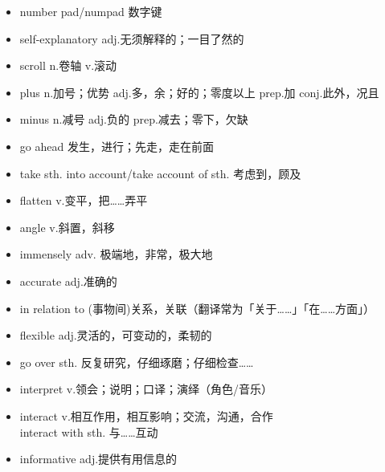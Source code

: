\documentclass[11pt,a4paper,UTF8,titlepage]{ctexrep} %
\begin{document}
\begin{multicols}{2}
\begin{itemize}
            \item number pad/numpad 数字键
            \item self-explanatory adj.无须解释的；一目了然的
            \item scroll n.卷轴 v.滚动
            \item plus n.加号；优势 adj.多，余；好的；零度以上 prep.加 conj.此外，况且
            \item minus n.减号 adj.负的 prep.减去；零下，欠缺
            \item go ahead 发生，进行；先走，走在前面
            \item take sth. into account/take account of sth. 考虑到，顾及
            \item flatten v.变平，把……弄平
            \item angle v.斜置，斜移
            \item immensely adv. 极端地，非常，极大地
            \item accurate adj.准确的
            \item in relation to (事物间)关系，关联（翻译常为「关于……」「在……方面」）
            \item flexible adj.灵活的，可变动的，柔韧的
            \item go over sth. 反复研究，仔细琢磨；仔细检查……
            \item interpret v.领会；说明；口译；演绎（角色/音乐）
            \item interact v.相互作用，相互影响；交流，沟通，合作\\interact with sth. 与……互动
            \item informative adj.提供有用信息的
        \end{itemize}
    \end{multicols}


    \ifx\collections\undefined
    \printbibliography %
    \clearpage %
    \printindex %
\end{document}
